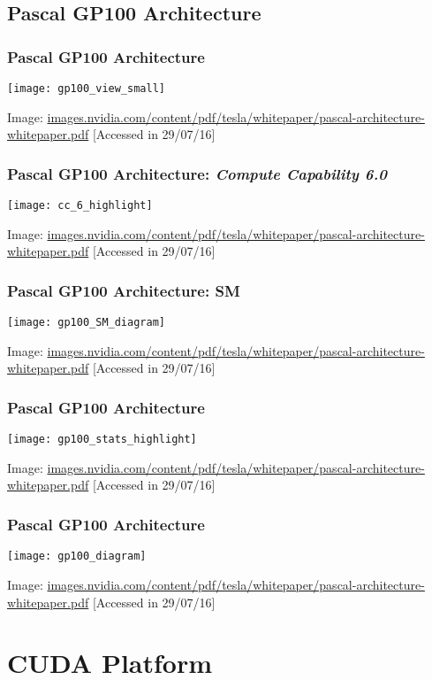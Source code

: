 \documentclass[10pt, compress]{beamer}
\begin{document}
\subsection{Pascal GP100 Architecture}

\begin{frame}
    \frametitle{Pascal GP100 Architecture}
    \centering
    \texttt{[image: gp100\_view\_small]}
    \vfill

    \tiny{Image: \url{images.nvidia.com/content/pdf/tesla/whitepaper/pascal-architecture-whitepaper.pdf} [Accessed in 29/07/16]}
\end{frame}

\begin{frame}
    \frametitle{Pascal GP100 Architecture: \textit{Compute Capability 6.0}}
    \centering
    \texttt{[image: cc\_6\_highlight]}
    \vfill

    \tiny{Image: \url{images.nvidia.com/content/pdf/tesla/whitepaper/pascal-architecture-whitepaper.pdf} [Accessed in 29/07/16]}
\end{frame}

\begin{frame}
    \frametitle{Pascal GP100 Architecture: SM}
    \centering
    \texttt{[image: gp100\_SM\_diagram]}
    \vfill

    \tiny{Image: \url{images.nvidia.com/content/pdf/tesla/whitepaper/pascal-architecture-whitepaper.pdf} [Accessed in 29/07/16]}
\end{frame}

\begin{frame}
    \frametitle{Pascal GP100 Architecture}
    \centering
    \texttt{[image: gp100\_stats\_highlight]}
    \vfill

    \tiny{Image: \url{images.nvidia.com/content/pdf/tesla/whitepaper/pascal-architecture-whitepaper.pdf} [Accessed in 29/07/16]}
\end{frame}

\begin{frame}
    \frametitle{Pascal GP100 Architecture}
    \centering
    \texttt{[image: gp100\_diagram]}
    \vfill

    \tiny{Image: \url{images.nvidia.com/content/pdf/tesla/whitepaper/pascal-architecture-whitepaper.pdf} [Accessed in 29/07/16]}
\end{frame}

\section{CUDA Platform}
\end{document}
